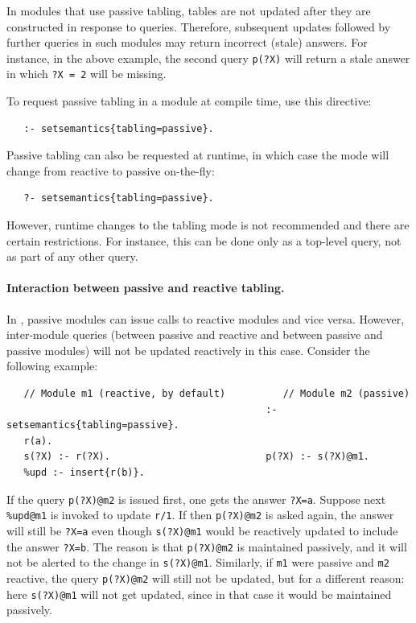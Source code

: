 \documentclass[11pt]{article}
\newcommand{\ERGO}{\mbox{\smaller{\ensuremath{\cal{E}}\smaller{{\sc{RGO}}}}}\xspace}
\newcommand{\FLSYSTEM}{\ERGO}
\begin{document}
In \FLSYSTEM modules that use passive tabling, tables are not updated
after they are constructed in response to queries. Therefore, subsequent
updates followed by further queries in such modules may
return incorrect (stale) answers. For instance, in the above example,
the second query \texttt{p(?X)} will return a stale answer in which 
\texttt{?X = 2} will be missing.  

To request passive tabling in a module at compile time, use this directive:
\begin{verbatim}
   :- setsemantics{tabling=passive}.
\end{verbatim}
Passive tabling can also be requested at runtime, in which case the mode
will change from reactive to passive on-the-fly:
\begin{verbatim}
   ?- setsemantics{tabling=passive}.
\end{verbatim}
However, runtime changes to the tabling mode is not recommended and there
are certain restrictions. For instance, this can be done only as a
top-level query, not as part of any other query.

\paragraph{Interaction between passive and reactive tabling.}
In \FLSYSTEM, passive modules can issue calls to reactive modules and vice
versa. However, inter-module queries (between passive and reactive
and between passive and passive modules)
will not be updated reactively in this case.
Consider the following example:
\begin{verbatim}
   // Module m1 (reactive, by default)          // Module m2 (passive)
                                             :- setsemantics{tabling=passive}.
   r(a).                                     
   s(?X) :- r(?X).                           p(?X) :- s(?X)@m1.
   %upd :- insert{r(b)}.
\end{verbatim}
If the query \texttt{p(?X)@m2} is issued first, one gets the answer \texttt{?X=a}.
Suppose next \texttt{\%upd@m1} is invoked to update \texttt{r/1}.
If then \texttt{p(?X)@m2} is asked again, the answer will still be
\texttt{?X=a} even though \texttt{s(?X)@m1} would be reactively updated to
include the answer \texttt{?X=b}. The reason is that \texttt{p(?X)@m2} is
maintained passively, and it will not be alerted to the change in
\texttt{s(?X)@m1}. Similarly, if \texttt{m1}  were
passive and \texttt{m2} reactive, the query \texttt{p(?X)@m2} will still not be
updated, but for a different reason: here \texttt{s(?X)@m1} will not get
updated, since in that case it would be maintained passively.
\end{document}
